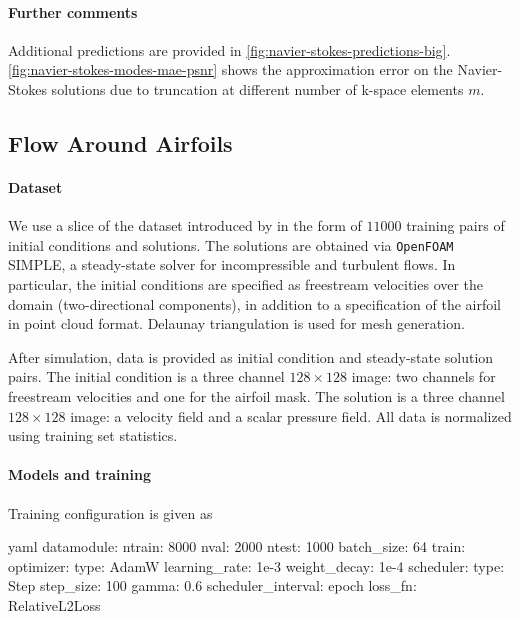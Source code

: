 \paragraph{Further comments}
Additional predictions are provided in \cref{fig:navier-stokes-predictions-big}. \cref{fig:navier-stokes-modes-mae-psnr} shows the approximation error on the Navier-Stokes solutions due to truncation at different number of k-space elements $m$.


\subsection{Flow Around Airfoils}\label{asec:exp_dfp}
%
\paragraph{Dataset}
%
We use a slice of the dataset introduced by \cite{thuerey2020deep} in the form of $11000$ training pairs of initial conditions and solutions. The solutions are obtained via {\tt OpenFOAM} \citep{jasak2007openfoam} SIMPLE, a steady-state solver for incompressible and turbulent flows. In particular, the initial conditions are specified as freestream velocities over the domain (two-directional components), in addition to a specification of the airfoil in point cloud format. Delaunay triangulation is used for mesh generation.

After simulation, data is provided as initial condition and steady-state solution pairs. The initial condition is a three channel $128 \times 128$ image: two channels for freestream velocities and one for the airfoil mask. The solution is a three channel $128 \times 128$ image: a velocity field and a scalar pressure field. All data is normalized using training set statistics.
%

\paragraph{Models and training}
%
Training configuration is given as

\begin{listing}[H]
\begin{mintedbox}{yaml}
datamodule: 
    ntrain: 8000
    nval: 2000
    ntest: 1000
    batch_size: 64
train:
    optimizer: 
        type: AdamW
        learning_rate: 1e-3
        weight_decay: 1e-4
    scheduler: 
        type: Step
        step_size: 100
        gamma: 0.6
        scheduler_interval: epoch
loss_fn: RelativeL2Loss
\end{mintedbox}
\vspace{-6mm}
\end{listing}

